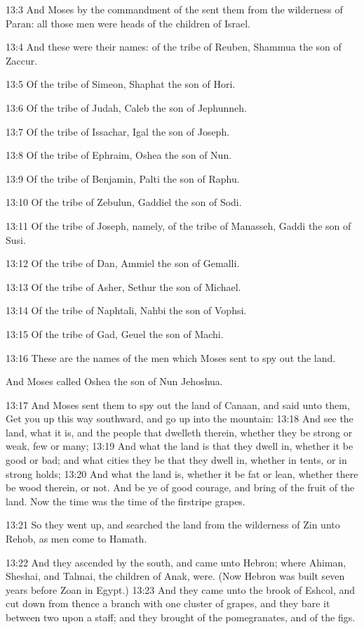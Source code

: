 13:3 And Moses by the commandment of the \LORD sent them from the wilderness of Paran: all those men were heads of the children of Israel.

13:4 And these were their names: of the tribe of Reuben, Shammua the son of Zaccur.

13:5 Of the tribe of Simeon, Shaphat the son of Hori.

13:6 Of the tribe of Judah, Caleb the son of Jephunneh.

13:7 Of the tribe of Issachar, Igal the son of Joseph.

13:8 Of the tribe of Ephraim, Oshea the son of Nun.

13:9 Of the tribe of Benjamin, Palti the son of Raphu.

13:10 Of the tribe of Zebulun, Gaddiel the son of Sodi.

13:11 Of the tribe of Joseph, namely, of the tribe of Manasseh, Gaddi the son of Susi.

13:12 Of the tribe of Dan, Ammiel the son of Gemalli.

13:13 Of the tribe of Asher, Sethur the son of Michael.

13:14 Of the tribe of Naphtali, Nahbi the son of Vophsi.

13:15 Of the tribe of Gad, Geuel the son of Machi.

13:16 These are the names of the men which Moses sent to spy out the land.

And Moses called Oshea the son of Nun Jehoshua.

13:17 And Moses sent them to spy out the land of Canaan, and said unto them, Get you up this way southward, and go up into the mountain: 13:18 And see the land, what it is, and the people that dwelleth therein, whether they be strong or weak, few or many; 13:19 And what the land is that they dwell in, whether it be good or bad; and what cities they be that they dwell in, whether in tents, or in strong holds; 13:20 And what the land is, whether it be fat or lean, whether there be wood therein, or not. And be ye of good courage, and bring of the fruit of the land. Now the time was the time of the firstripe grapes.

13:21 So they went up, and searched the land from the wilderness of Zin unto Rehob, as men come to Hamath.

13:22 And they ascended by the south, and came unto Hebron; where Ahiman, Sheshai, and Talmai, the children of Anak, were. (Now Hebron was built seven years before Zoan in Egypt.)  13:23 And they came unto the brook of Eshcol, and cut down from thence a branch with one cluster of grapes, and they bare it between two upon a staff; and they brought of the pomegranates, and of the figs.


